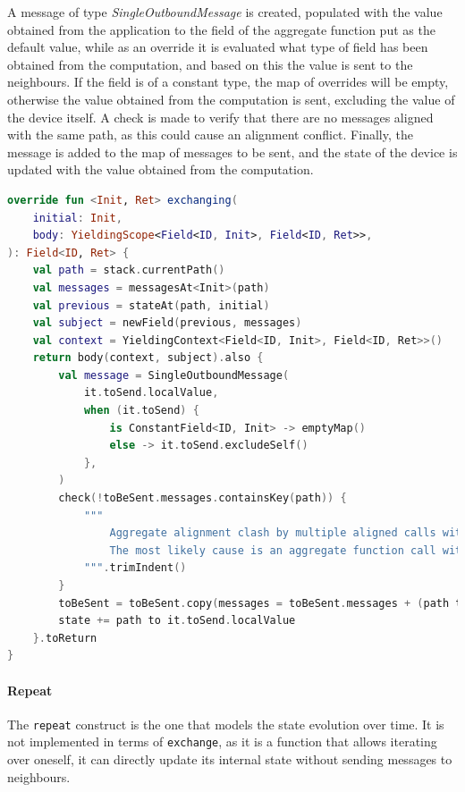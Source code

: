 A message of type \emph{SingleOutboundMessage} is created, populated with the value obtained from the application to the field
of the aggregate function put as the default value, while as an override it is evaluated what type of field has been
obtained from the computation, and based on this the value is sent to the neighbours.
If the field is of a constant type, the map of overrides will be empty, otherwise the value obtained from the computation
is sent, excluding the value of the device itself.
A check is made to verify that there are no messages aligned with the same path, as this could cause an alignment conflict.
Finally, the message is added to the map of messages to be sent, and the state of the device is updated with the value obtained from the computation.

\begin{lstlisting}[language=kt,label={lst:exchanging},caption={The implementation of the \texttt{exchanging} function.}]
override fun <Init, Ret> exchanging(
    initial: Init,
    body: YieldingScope<Field<ID, Init>, Field<ID, Ret>>,
): Field<ID, Ret> {
    val path = stack.currentPath()
    val messages = messagesAt<Init>(path)
    val previous = stateAt(path, initial)
    val subject = newField(previous, messages)
    val context = YieldingContext<Field<ID, Init>, Field<ID, Ret>>()
    return body(context, subject).also {
        val message = SingleOutboundMessage(
            it.toSend.localValue,
            when (it.toSend) {
                is ConstantField<ID, Init> -> emptyMap()
                else -> it.toSend.excludeSelf()
            },
        )
        check(!toBeSent.messages.containsKey(path)) {
            """
                Aggregate alignment clash by multiple aligned calls with the same path: $path.
                The most likely cause is an aggregate function call within a loop
            """.trimIndent()
        }
        toBeSent = toBeSent.copy(messages = toBeSent.messages + (path to message))
        state += path to it.toSend.localValue
    }.toReturn
}
\end{lstlisting}

\paragraph{Repeat}
\label{par:repeating}
The \texttt{repeat} construct is the one that models the state evolution over time.
It is not implemented in terms of \texttt{exchange}, as it is a function that allows iterating over oneself,
it can directly update its internal state without sending messages to neighbours.


